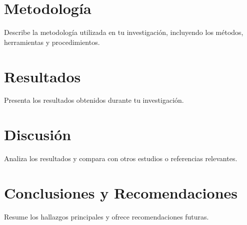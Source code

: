 \documentclass[12pt]{report}
\begin{document}

	
\chapter{Metodología}
Describe la metodología utilizada en tu investigación, incluyendo los métodos, herramientas y procedimientos.

\chapter{Resultados}
Presenta los resultados obtenidos durante tu investigación.

\chapter{Discusión}
Analiza los resultados y compara con otros estudios o referencias relevantes.

\chapter{Conclusiones y Recomendaciones}
Resume los hallazgos principales y ofrece recomendaciones futuras.
\end{document}
